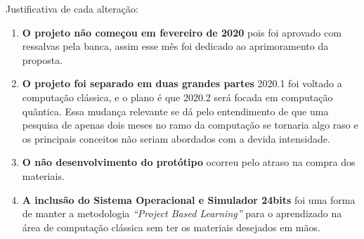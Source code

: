 Justificativa de cada alteração:
\begin{enumerate}
  \item \textbf{O projeto não começou em fevereiro de 2020} pois foi aprovado com ressalvas pela banca, assim esse mês foi dedicado ao aprimoramento da proposta.
  \item \textbf{O projeto foi separado em duas grandes partes} 2020.1 foi voltado a computação clássica, e o plano é que 2020.2 será focada em computação quântica. Essa mudança relevante se dá pelo entendimento de que uma pesquisa de apenas dois meses no ramo da computação se tornaria algo raso e os principais conceitos não seriam abordados com a devida intensidade.
  \item \textbf{O não desenvolvimento do protótipo} ocorreu pelo atraso na compra dos materiais.
  \item \textbf{A inclusão do Sistema Operacional e Simulador 24bits} foi uma forma de manter a metodologia \textit{``Project Based Learning''} para o aprendizado na área de computação clássica sem ter os materiais desejados em mãos.
\end{enumerate}


